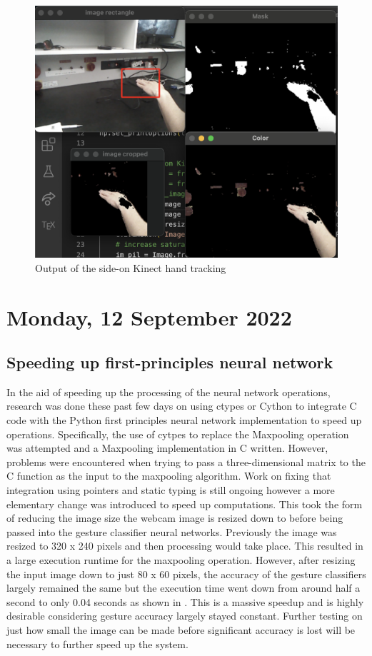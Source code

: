 \begin{figure}[h]
    \centering
    \includegraphics[width=0.7\linewidth]{figures/kinect_side_hand_tracking.png}
    \caption{Output of the side-on Kinect hand tracking}
    \label{fig:kinect_side_hand_tracking}
\end{figure}

\section[2022/09/12]{Monday, 12 September 2022}

\subsection{Speeding up first-principles neural network}

In the aid of speeding up the processing of the neural network operations, research was done these past few days on using ctypes or Cython to integrate C code with the Python first principles neural network implementation to speed up operations. Specifically, the use of cytpes to replace the Maxpooling operation was attempted and a Maxpooling implementation in C written. However, problems were encountered when trying to pass a three-dimensional matrix to the C function as the input to the maxpooling algorithm. Work on fixing that integration using pointers and static typing is still ongoing however a more elementary change was introduced to speed up computations. This took the form of reducing the image size the webcam image is resized down to before being passed into the gesture classifier neural networks. Previously the image was resized to 320 x 240 pixels and then processing would take place. This resulted in a large execution runtime for the maxpooling operation. However, after resizing the input image down to just 80 x 60 pixels, the accuracy of the gesture classifiers largely remained the same but the execution time went down from around half a second to only 0.04 seconds as shown in . This is a massive speedup and is highly desirable considering gesture accuracy largely stayed constant. Further testing on just how small the image can be made before significant accuracy is lost will be necessary to further speed up the system.


